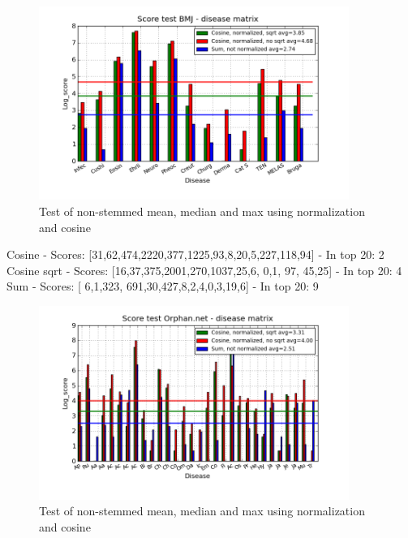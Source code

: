 \begin{figure}[h!]
        \begin{center}
          \includegraphics[width=0.9\textwidth]{barcharts/diseaseMatrix_bmj_hist_norm_3000_ns_cos_sqrt_cos_sum_nn.png}
        \end{center}
        \caption{Test of non-stemmed mean, median and max using normalization and cosine}
        \label{diseaseMatrix_bmj_hist_norm_3000_ns_cos_sqrt_cos_sum_nn}
\end{figure}
{\small
Cosine - Scores: [31,62,474,2220,377,1225,93,8,20,5,227,118,94] - In top 20: 2 \\
Cosine sqrt - Scores: [16,37,375,2001,270,1037,25,6, 0,1, 97, 45,25] - In top 20: 4 \\
Sum - Scores: [ 6,1,323, 691,30,427,8,2,4,0,3,19,6] - In top 20: 9 \\
}
\begin{figure}[h!]
        \begin{center}
          \includegraphics[width=0.9\textwidth]{barcharts/diseaseMatrix_orphan_hist_NOTnorm_3000_ns_cos_sqrt_cos_sum_nn.png}
        \end{center}
        \caption{Test of non-stemmed mean, median and max using normalization and cosine}
        \label{diseaseMatrix_orphan_hist_NOTnorm_3000_ns_cos_sqrt_cos_sum_nn}
\end{figure}
